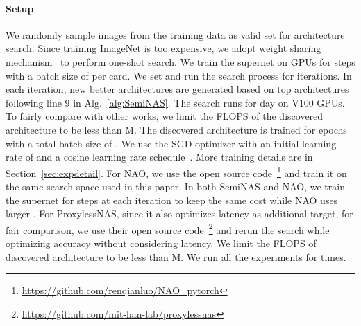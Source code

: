 \documentclass{article}
\begin{document}
\paragraph{Setup} We randomly sample  images from the training data as valid set for architecture search. Since training ImageNet is too expensive, we adopt weight sharing mechanism~\cite{enas,proxylessnas} to perform one-shot search. We train the supernet on  GPUs for  steps with a batch size of  per card. We set  and run the search process for  iterations. In each iteration,  new better architectures are generated based on top  architectures following line 9 in Alg.~\ref{alg:SemiNAS}. The search runs for  day on  V100 GPUs. To fairly compare with other works, we limit the FLOPS of the discovered architecture to be less than M. The discovered architecture 
is trained for  epochs with a total batch size of . We use the SGD optimizer with an initial learning rate of  and a cosine learning rate schedule~\cite{sgdr}. More training details are in Section~\ref{sec:expdetail}. For NAO, we use the open source code~\footnote{\url{https://github.com/renqianluo/NAO_pytorch}} and train it on the same search space used in this paper. In both SemiNAS and NAO, we train the supernet for  steps at each iteration to keep the same cost while NAO uses larger . For ProxylessNAS, since it also optimizes latency as additional target, for fair comparison, we use their open source code~\footnote{\url{https://github.com/mit-han-lab/proxylessnas}} and rerun the search while optimizing accuracy without considering latency. We limit the FLOPS of discovered architecture to be less than M. We run all the experiments for  times.
\end{document}
